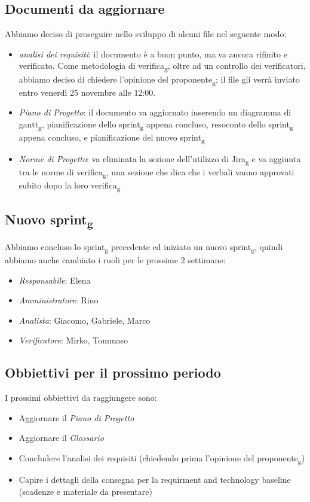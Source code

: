 \subsection{Documenti da aggiornare}
Abbiamo deciso di proseguire nello sviluppo di alcuni file nel seguente modo:
\begin{itemize}
	\item \textit{analisi dei requisiti}: il documento è a buon punto, ma va ancora rifinito e verificato. Come metodologia di verifica\textsubscript{g}, oltre ad un controllo dei verificatori, abbiamo deciso di chiedere l'opinione del proponente\textsubscript{g}; il file gli verrà inviato entro venerdì 25 novembre alle 12:00.
	\item \textit{\textit{Piano di Progetto}}: il documento va aggiornato inserendo un diagramma di gantt\textsubscript{g}, pianificazione dello sprint\textsubscript{g} appena concluso, resoconto dello sprint\textsubscript{g} appena concluso, e pianificazione del nuovo sprint\textsubscript{g}
	\item \textit{\textit{Norme di Progetto}}: va eliminata la sezione dell'utilizzo di Jira\textsubscript{g} e va aggiunta tra le norme di verifica\textsubscript{g}, una sezione che dica che i verbali vanno approvati subito dopo la loro verifica\textsubscript{g}
\end{itemize}

\subsection{Nuovo sprint\textsubscript{g}}
Abbiamo concluso lo sprint\textsubscript{g} precedente ed iniziato un nuovo sprint\textsubscript{g}, quindi abbiamo anche cambiato i ruoli per le prossime 2 settimane:
\begin{itemize}
\item \textit{Responsabile}: Elena
\item \textit{Amministratore}: Rino
\item \textit{Analista}: Giacomo, Gabriele, Marco
\item \textit{Verificatore}: Mirko, Tommaso
\end{itemize}

\subsection{Obbiettivi per il prossimo periodo}
I prossimi obbiettivi da raggiungere sono:
\begin{itemize}
\item Aggiornare il \textit{Piano di Progetto}
\item Aggiornare il \textit{Glossario}
\item Concludere l'analisi dei requisiti (chiedendo prima l'opinione del proponente\textsubscript{g})
\item Capire i dettagli della consegna per la requirment and technology baseline (scadenze e materiale da presentare)
\end{itemize}

